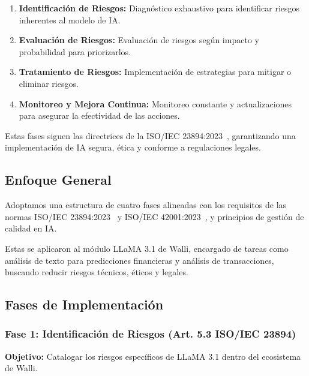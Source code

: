 \documentclass[12pt]{article}
\begin{document}
\begin{enumerate}
    \item \textbf{Identificación de Riesgos:} Diagnóstico exhaustivo para identificar riesgos inherentes al modelo de IA.
    \item \textbf{Evaluación de Riesgos:} Evaluación de riesgos según impacto y probabilidad para priorizarlos.
    \item \textbf{Tratamiento de Riesgos:} Implementación de estrategias para mitigar o eliminar riesgos.
    \item \textbf{Monitoreo y Mejora Continua:} Monitoreo constante y actualizaciones para asegurar la efectividad de las acciones.
\end{enumerate}

Estas fases siguen las directrices de la ISO/IEC 23894:2023~\cite{iso23894}, garantizando una implementación de IA segura, ética y conforme a regulaciones legales.

\subsection{Enfoque General}
Adoptamos una estructura de cuatro fases alineadas con los requisitos de las normas 
ISO/IEC 23894:2023~\cite{iso23894} y ISO/IEC 42001:2023~\cite{intedya}, y principios de gestión de calidad en IA. 

Estas se aplicaron al módulo LLaMA 3.1 de Walli, encargado de tareas como análisis de texto 
para predicciones financieras y análisis de transacciones, buscando reducir riesgos técnicos, 
éticos y legales.

\subsection{Fases de Implementación}

\subsubsection{Fase 1: Identificación de Riesgos (Art. 5.3 ISO/IEC 23894)}
\textbf{Objetivo:} Catalogar los riesgos específicos de LLaMA 3.1 dentro del ecosistema de Walli.
\end{document}

